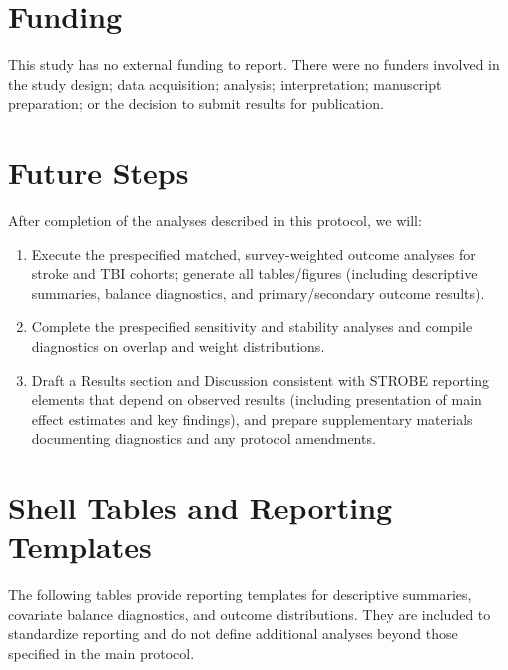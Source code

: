 \documentclass{article}
\begin{document}
\section{Funding}
This study has no external funding to report. There were no funders involved in the study design; data acquisition; analysis; interpretation; manuscript preparation; or the decision to submit results for publication.

\section{Future Steps}

After completion of the analyses described in this protocol, we will:
\begin{enumerate}
    \item Execute the prespecified matched, survey-weighted outcome analyses for stroke and TBI cohorts; generate all tables/figures (including descriptive summaries, balance diagnostics, and primary/secondary outcome results).
    \item Complete the prespecified sensitivity and stability analyses and compile diagnostics on overlap and weight distributions.
    \item Draft a Results section and Discussion consistent with STROBE reporting elements that depend on observed results (including presentation of main effect estimates and key findings), and prepare supplementary materials documenting diagnostics and any protocol amendments.
\end{enumerate}

\appendix
\section{Shell Tables and Reporting Templates}
\label{app:shell-tables}

The following tables provide reporting templates for descriptive summaries, covariate balance diagnostics, and outcome distributions. They are included to standardize reporting and do not define additional analyses beyond those specified in the main protocol.

\end{document}
